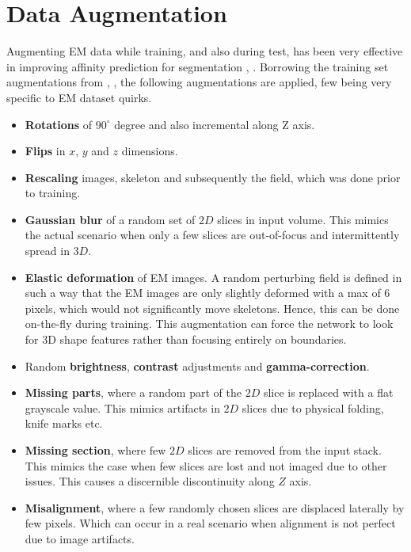 \section{Data Augmentation}
Augmenting EM data while training, and also during test, has been very effective in improving affinity prediction for segmentation \cite{Zeng2017}, \cite{Kisuk2017}.
Borrowing the training set augmentations from \cite{Kisuk2017}, \cite{ELEKTRONN}, the following augmentations are applied, few being very specific to EM dataset quirks.
\begin{itemize}
	\item \textbf{Rotations} of $90^{\circ}$ degree and also incremental along Z axis.
	\item \textbf{Flips} in $x$, $y$ and $z$ dimensions.
	\item \textbf{Rescaling} images, skeleton and subsequently the field, which was done prior to training.
	\item \textbf{Gaussian blur} of a random set of $2D$ slices in input volume. This mimics the actual scenario when only a few slices are out-of-focus and intermittently spread in $3D$.
	\item \textbf{Elastic deformation} of EM images. A random perturbing field is defined in such a way that the EM images are only slightly deformed with a max of 6 pixels, which would not significantly move skeletons. Hence, this can be done on-the-fly during training. This augmentation can force the network to look for 3D shape features rather than focusing entirely on boundaries.
	\item Random \textbf{brightness}, \textbf{contrast} adjustments and \textbf{gamma-correction}.
	\item \textbf{Missing parts}, where a random part of the $2D$ slice is replaced with a flat grayscale value. This mimics artifacts in $2D$ slices due to physical folding, knife marks etc.
	\item \textbf{Missing section}, where few $2D$ slices are removed from the input stack. This mimics the case when few slices are lost and not imaged due to other issues. This causes a discernible discontinuity along $Z$ axis.
	\item \textbf{Misalignment}, where a few randomly chosen slices are displaced laterally by few pixels. Which can occur in a real scenario when alignment is not perfect due to image artifacts. 
\end{itemize}
  
